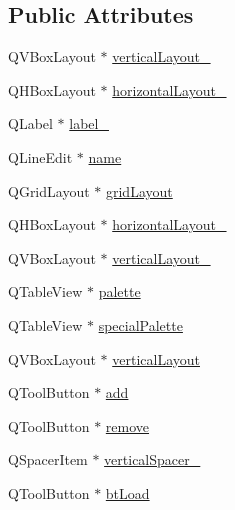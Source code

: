 \subsection*{Public Attributes}
\begin{DoxyCompactItemize}
\item 
Q\+V\+Box\+Layout $\ast$ \mbox{\hyperlink{class_ui___edit_palette_dialog_a99d75282f0564d5450aa218785f00905}{vertical\+Layout\+\_}}
\item 
Q\+H\+Box\+Layout $\ast$ \mbox{\hyperlink{class_ui___edit_palette_dialog_a78ffd396444935e731dcbd0d6033c732}{horizontal\+Layout\+\_}}
\item 
Q\+Label $\ast$ \mbox{\hyperlink{class_ui___edit_palette_dialog_afc88dc6a666760dac99b8311f6f54c50}{label\+\_}}
\item 
Q\+Line\+Edit $\ast$ \mbox{\hyperlink{class_ui___edit_palette_dialog_acc1c64be00de663da04871515e7ea662}{name}}
\item 
Q\+Grid\+Layout $\ast$ \mbox{\hyperlink{class_ui___edit_palette_dialog_a03762c842b7ecb3bf862bcaaaf38b9bc}{grid\+Layout}}
\item 
Q\+H\+Box\+Layout $\ast$ \mbox{\hyperlink{class_ui___edit_palette_dialog_afc60618572705d5b7c9854108aa4c9bf}{horizontal\+Layout\+\_}}
\item 
Q\+V\+Box\+Layout $\ast$ \mbox{\hyperlink{class_ui___edit_palette_dialog_a2348eddabdb3757f9e1b6897e96cc152}{vertical\+Layout\+\_}}
\item 
Q\+Table\+View $\ast$ \mbox{\hyperlink{class_ui___edit_palette_dialog_a0675061cd26274616f0c45331526fce7}{palette}}
\item 
Q\+Table\+View $\ast$ \mbox{\hyperlink{class_ui___edit_palette_dialog_a42b3cf73691026cf923cc8de25ce97ef}{special\+Palette}}
\item 
Q\+V\+Box\+Layout $\ast$ \mbox{\hyperlink{class_ui___edit_palette_dialog_aac134889fe26a52260da8d21a1becd80}{vertical\+Layout}}
\item 
Q\+Tool\+Button $\ast$ \mbox{\hyperlink{class_ui___edit_palette_dialog_a72431ea09db9af7d07a4fd05515823fd}{add}}
\item 
Q\+Tool\+Button $\ast$ \mbox{\hyperlink{class_ui___edit_palette_dialog_a1c68d46595c9d048090e411f00a2e4e6}{remove}}
\item 
Q\+Spacer\+Item $\ast$ \mbox{\hyperlink{class_ui___edit_palette_dialog_a6dc68e3b37d057b6b6f3793e494f3d43}{vertical\+Spacer\+\_}}
\item 
Q\+Tool\+Button $\ast$ \mbox{\hyperlink{class_ui___edit_palette_dialog_aa63ff66e9d7bbe1b64ec30e8eef9b573}{bt\+Load}}

\end{DoxyCompactItemize}
